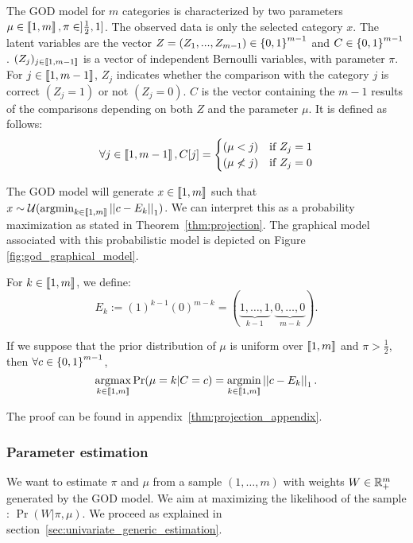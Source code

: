 The GOD model for $m$ categories is characterized by two parameters $\mu \in \left\llbracket1, m\right\rrbracket, \pi \in ]\frac{1}{2}, 1]$. The observed data is only the selected category $x$. The latent variables are the vector $Z = (Z_1,...,Z_{m-1}) \in \left\{ 0, 1 \right\}^{m - 1}$ and $C \in \left\{ 0, 1 \right\}^{m-1}$.
$(Z_j)_{j\in\left\llbracket1,m-1\right\rrbracket}$ is a vector of independent Bernoulli variables, with parameter $\pi$. For $j \in \left\llbracket1, m-1\right\rrbracket$, $Z_j$ indicates whether the comparison with the category $j$ is correct $(Z_j=1)$ or not $(Z_j=0)$. $C$ is the vector containing the $m-1$ results of the comparisons depending on both $Z$ and the parameter $\mu$. It is defined as follows:
\[
\forall j \in \left\llbracket1, m-1\right\rrbracket, C[j] = \begin{cases}
    (\mu < j) & \text{if}\  Z_j = 1\\
    (\mu \not< j) & \text{if}\  Z_j = 0
\end{cases} \]

The GOD model will generate $x \in \left\llbracket1, m\right\rrbracket$ such that $x \sim \mathcal{U}(\operatorname*{argmin}_{k \in \left\llbracket1, m\right\rrbracket} \left|\left|c - E_k\right|\right|_1)$. We can interpret this as a probability maximization as stated in Theorem~\ref{thm:projection}. The graphical model associated with this probabilistic model is depicted on Figure \ref{fig:god_graphical_model}.


\begin{definition}
    For $k \in \left\llbracket1, m\right\rrbracket$, we define:
    \[E_k := (1)^{k-1} (0)^{m - k} = (\underset{k-1}{\underbrace{1, \dots, 1}}, \underset{m - k}{\underbrace{0, \dots, 0}} ). \]
\end{definition}


\begin{thm}
    \label{thm:projection}
    If we suppose that the prior distribution of $\mu$ is uniform over $\left\llbracket1, m\right\rrbracket$ and $\pi > \frac{1}{2}$, then \(\forall c \in \left\{ 0, 1 \right\}^{m-1}\),
    \[\operatorname*{argmax}_{k \in \left\llbracket1, m\right\rrbracket} \Pr(\mu = k | C = c) = \operatorname*{argmin}_{k \in \left\llbracket1, m\right\rrbracket} \left|\left|c - E_k\right|\right|_1.\]
\end{thm}

The proof can be found in appendix~\ref{thm:projection_appendix}.

\subsubsection{Parameter estimation}

We want to estimate $\pi$ and $\mu$ from a sample $(1, \dots, m)$ with weights $W \in \mathbb{R}_{+}^m$ generated by the GOD model. We aim at maximizing the likelihood of the sample : $\Pr(W | \pi, \mu)$. We proceed as explained in section~\ref{sec:univariate_generic_estimation}.

